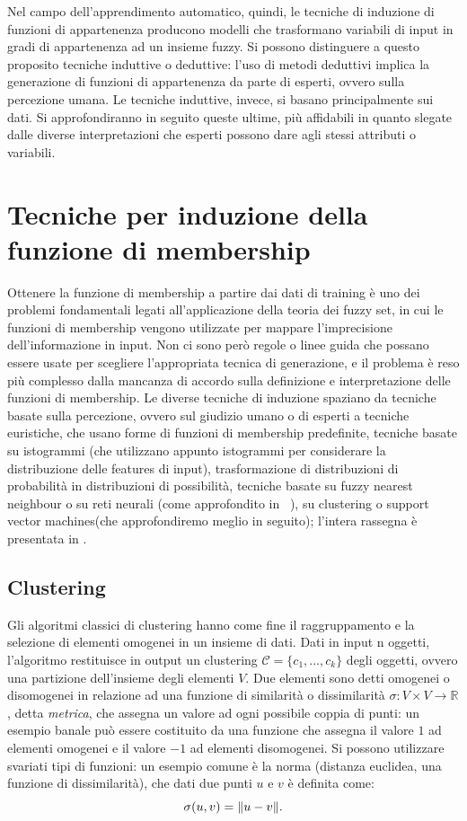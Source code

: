 \documentclass{article}
\DeclarePairedDelimiter{\norma}{\lVert}{\rVert}
\begin{document}
	Nel campo dell'apprendimento automatico, quindi, le tecniche di induzione di funzioni di appartenenza producono modelli che trasformano variabili di input in gradi di appartenenza ad un insieme fuzzy. Si possono distinguere a questo proposito tecniche induttive o deduttive: l'uso di metodi deduttivi implica la generazione di funzioni di appartenenza da parte di esperti, ovvero sulla percezione umana. Le tecniche induttive, invece, si basano principalmente sui dati. Si approfondiranno in seguito queste ultime, più affidabili in quanto slegate dalle diverse interpretazioni che esperti possono dare agli stessi attributi o variabili.
	

	\section{Tecniche per induzione della funzione di membership}
	Ottenere la funzione di membership a partire dai dati di training è uno dei problemi fondamentali legati all'applicazione della teoria dei fuzzy set, in cui le funzioni di membership vengono utilizzate per mappare l'imprecisione dell'informazione in input. Non ci sono però regole o linee guida che possano essere usate per scegliere l'appropriata tecnica di generazione, e il problema è reso più complesso dalla mancanza di accordo sulla definizione e interpretazione delle funzioni di membership. Le diverse tecniche di induzione spaziano da tecniche basate sulla percezione, ovvero sul giudizio umano o di esperti a tecniche euristiche, che usano forme di funzioni di membership predefinite, tecniche basate su istogrammi (che utilizzano appunto istogrammi per considerare la distribuzione delle features di input), trasformazione di distribuzioni di probabilità in distribuzioni di possibilità, tecniche basate su fuzzy nearest neighbour o su reti neurali (come approfondito in ~\cite{bib:rita}), su clustering o support vector machines(che approfondiremo meglio in seguito); l'intera rassegna è presentata in \cite{bib:rassegna}.
	
	\subsection{Clustering}
	Gli algoritmi classici di clustering hanno come fine il raggruppamento e la selezione di elementi omogenei in un insieme di dati. Dati in input n oggetti, l'algoritmo restituisce in output un clustering $\mathcal{C}=\{c_1, ..., c_k\}$ degli oggetti, ovvero una partizione dell'insieme degli elementi $V$. Due elementi sono detti omogenei o disomogenei in relazione ad una funzione di similarità o dissimilarità $\sigma: V\times V\rightarrow \mathbb{R}$, detta \textit{metrica}, che assegna un valore ad ogni possibile coppia di punti: un esempio banale può essere costituito da una funzione che assegna il valore $1$ ad elementi omogenei e il valore $-1$ ad elementi disomogenei. Si possono utilizzare svariati tipi di funzioni: un esempio comune è la norma (distanza euclidea, una funzione di dissimilarità), che dati due punti $u$ e $v$ è definita come:
	\[
		\sigma(u, v) = \norma{u - v}\text{.}
	\]
	
\end{document}
